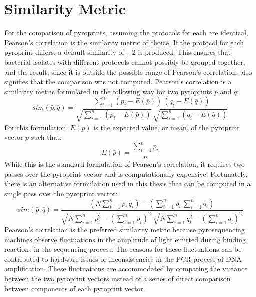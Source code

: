 \documentclass[12pt]{ucthesis}
\begin{document}
   \section{Similarity Metric}\label{sec:sim_metric}
      For the comparison of pyroprints, assuming the protocols for each are
      identical, Pearson's correlation is the similarity metric of choice. If
      the protocol for each pyroprint differs, a default similarity of $-2$ is
      produced. This ensures that bacterial isolates with different protocols
      cannot possibly be grouped together, and the result, since it is outside
      the possible range of Pearson's correlation, also signifies that the
      comparison was not computed. Pearson's correlation is a similarity
      metric formulated in the following way for two pyroprints $\bar{p}$ and
      $\bar{q}$:
      $$
         sim(\bar{p},\bar{q}) =
         \frac{
            \sum_{i=1}^{n}{(p_i - E(\bar{p})) \: (q_i - E(\bar{q}))}
         }
         {
            \sqrt{\sum_{i=1}^{n}(p_i-E(\bar{p}))} \:
            \sqrt{\sum_{i=1}^{n}(q_i-E(\bar{q}))}
         }
      $$
      For this formulation, $E(p)$ is the expected value, or mean, of the
      pyroprint vector $p$ such that:
      $$E(\bar{p}) = \frac{\sum_{i=1}^{n}{p_i}}{n}$$
      While this is the standard formulation of Pearson's correlation, it
      requires two passes over the pyroprint vector and is computationally
      expensive. Fortunately, there is an alternative formulation used in this
      thesis that can be computed in a single pass over the pyroprint vector:
      $$
         sim(\bar{p},\bar{q}) =
         \frac{
            (N\sum_{i=1}^{n}{p_i \, q_i}) -
            (\sum_{i=1}^{n}{p_i} \, \sum_{i=1}^{n}{q_i})
         }
         {
            \sqrt{N \sum_{i=1}^{n}{p_i^2} - (\sum_{i=1}^{n}{p_i})^2}
            \:
            \sqrt{N \sum_{i=1}^{n}{q_i^2} - (\sum_{i=1}^{n}{q_i})^2}
         }
      $$
      Pearson's correlation is the preferred similarity metric because
      pyrosequencing machines observe fluctuations in the amplitude of light
      emitted during binding reactions in the sequencing process. The reasons
      for these fluctuations can be contributed to hardware issues or
      inconsistencies in the PCR process of DNA amplification. These
      fluctuations are accommodated by comparing the variance between the two
      pyroprint vectors instead of a series of direct comparison between
      components of each pyroprint vector.
\end{document}
